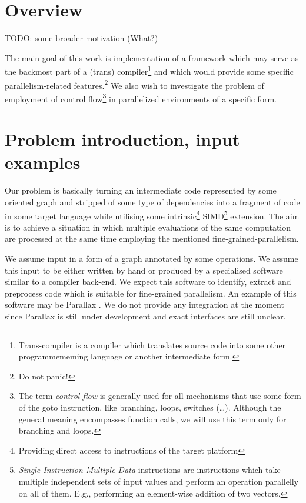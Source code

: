 
\section{Overview}

TODO: some broader motivation (What?)

The main goal of this work is implementation of a framework which may serve as the backmost part of a (trans) compiler\footnote{Trans-compiler is a compiler which translates source code into some other programmememing language or another intermediate form.} and which would provide some specific parallelism-related features.\footnote{Do not panic!} We also wish to investigate the problem of employment of control flow\footnote{The term \emph{control flow} is generally used for all mechanisms that use some form of the goto instruction, like branching, loops, switches (\dots). Although the general meaning encompasses function calls, we will use this term only for branching and loops.} in parallelized environments of a specific form.

\section{Problem introduction, input examples}

Our problem is basically turning an intermediate code represented by some oriented graph and stripped of some type of dependencies into a fragment of code in some target language while utilising some intrinsic\footnote{Providing direct access to instructions of the target platform} SIMD\footnote{\emph{Single-Instruction Multiple-Data} instructions are instructions which take multiple independent sets of input values and perform an operation parallelly on all of them. E.g., performing an element-wise addition of two vectors.} extension. The aim is to achieve a situation in which multiple evaluations of the same computation are processed at the same time employing the mentioned fine-grained-parallelism. 


We assume input in a form of a graph annotated by some operations. We assume this input to be either written by hand or produced by a specialised software similar to a compiler back-end. We expect this software to identify, extract and preprocess code which is suitable for fine-grained parallelism.  An example of this software may be Parallax \cite{parallax}. We do not provide any integration at the moment since Parallax is still under development and exact interfaces are still unclear.


